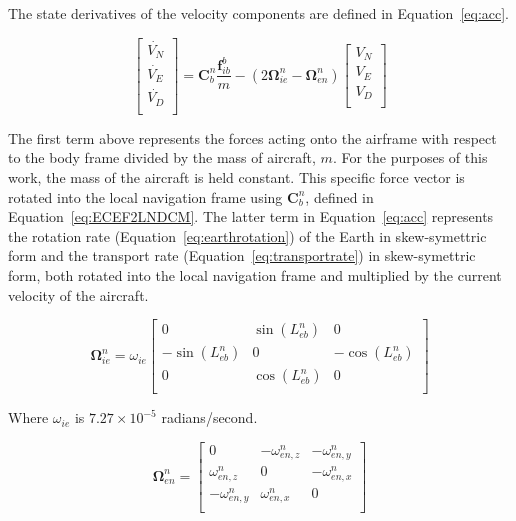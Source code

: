 The state derivatives of the velocity components are defined in Equation~\ref{eq:acc}.

\begin{equation}\label{eq:acc}
    \begin{bmatrix}
        \dot{V_N} \\
        \dot{V_E} \\
        \dot{V_D} \\
    \end{bmatrix} =
    \mathbf{C}_{b}^{n}\frac{\mathbf{f}_{ib}^b}{m} - \left(2\mathbf{\Omega}_{ie}^n - \mathbf{\Omega}_{en}^n\right)
    \begin{bmatrix}
        V_N \\
        V_E \\
        V_D \\
    \end{bmatrix}
\end{equation}

The first term above represents the forces acting onto the airframe with respect to the body frame divided by the mass of aircraft, \(m\). For the purposes of this work, the mass of the aircraft is held constant. This specific force vector is rotated into the local navigation frame using \(\mathbf{C}_b^n\), defined in Equation~\ref{eq:ECEF2LNDCM}. The latter term in Equation~\ref{eq:acc} represents the rotation rate (Equation~\ref{eq:earthrotation}) of the Earth in skew-symettric form and the transport rate (Equation~\ref{eq:transportrate}) in skew-symettric form, both rotated into the local navigation frame and multiplied by the current velocity of the aircraft.

\begin{equation}\label{eq:earthrotation}
    \mathbf{\Omega}_{ie}^n =
    \omega_{ie}\begin{bmatrix}
        0                          & \sin\left(L_{eb}^n\right) & 0                          \\
        -\sin\left(L_{eb}^n\right) & 0                         & -\cos\left(L_{eb}^n\right) \\
        0                          & \cos\left(L_{eb}^n\right) & 0                          \\
    \end{bmatrix}
\end{equation}

Where \(\omega_{ie}\) is \(7.27\times10^{-5}\) radians/second.

\begin{equation}\label{eq:transportrate}
    \mathbf{\Omega}_{en}^n = \begin{bmatrix}
        0                & -\omega_{en,z}^n & -\omega_{en,y}^n \\
        \omega_{en,z}^n  & 0                & -\omega_{en,x}^n \\
        -\omega_{en,y}^n & \omega_{en,x}^n  & 0                \\
    \end{bmatrix}
\end{equation}

